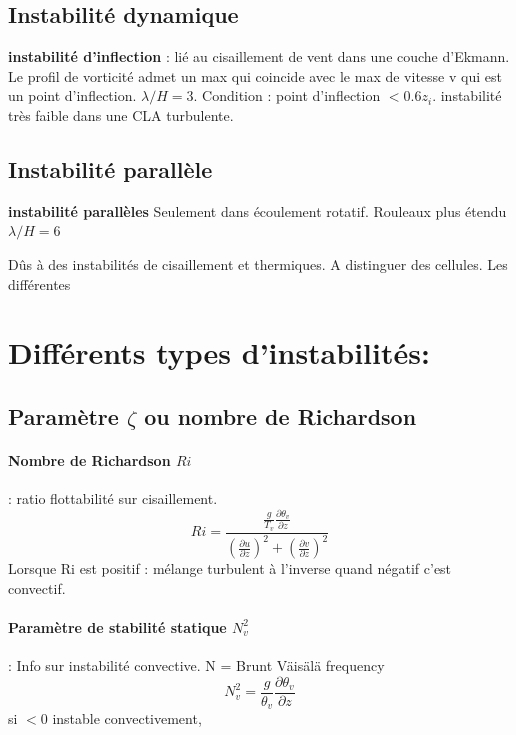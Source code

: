 \subsection{Instabilité dynamique}
\textbf{instabilité d'inflection} : lié au cisaillement de vent dans une couche d'Ekmann. Le profil de vorticité admet un max qui coincide avec le max de vitesse v qui est un point d'inflection. $\lambda/H = 3$. Condition : point d'inflection $<0.6 z_i$. instabilité très faible dans une CLA turbulente. 

\subsection{Instabilité parallèle}
\textbf{instabilité parallèles} Seulement dans écoulement rotatif. Rouleaux plus étendu $\lambda/H = 6$

Dûs à des instabilités de cisaillement et thermiques. A distinguer des cellules. Les différentes

\section{Différents types d'instabilités: } 




\subsection{Paramètre $\zeta$ ou nombre de Richardson}
\paragraph{Nombre de Richardson $Ri$}: ratio flottabilité sur cisaillement. 
\begin{equation}
Ri = \frac{\frac{g}{T_v}\frac{\partial \theta_v}{\partial z}}{\left(\frac{\partial u}{\partial z}\right)^2 + \left(\frac{\partial v}{\partial z}\right)^2 }
\end{equation}
Lorsque Ri est positif : mélange turbulent à l'inverse quand négatif c'est convectif.


\paragraph{Paramètre de stabilité statique $N_v^2$}: Info sur instabilité convective. 
N = Brunt Väisälä frequency 
\begin{equation}
	N_v^2 = \frac{g}{\theta_v} \frac{\partial \theta_v}{\partial z}
\end{equation}
si $<0$ instable convectivement, 

